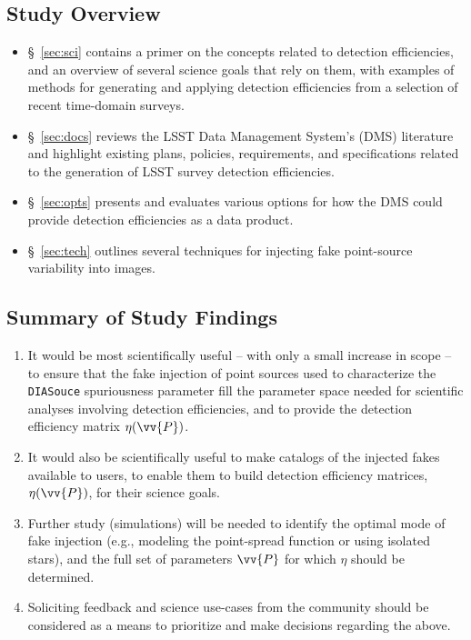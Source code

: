 \documentclass[DM,lsstdraft,toc]{lsstdoc}
\begin{document}
\subsection{Study Overview}
\begin{itemize}
\item \S~\ref{sec:sci} contains a primer on the concepts related to detection efficiencies, and an overview of several science goals that rely on them, with examples of methods for generating and applying detection efficiencies from a selection of recent time-domain surveys. 
\item \S~\ref{sec:docs} reviews the LSST Data Management System's (DMS) literature and highlight existing plans, policies, requirements, and specifications related to the generation of LSST survey detection efficiencies. 
\item \S~\ref{sec:opts} presents and evaluates various options for how the DMS could provide detection efficiencies as a data product. 
\item \S~\ref{sec:tech} outlines several techniques for injecting fake point-source variability into images.
\end{itemize}

\subsection{Summary of Study Findings}
\begin{enumerate}
\item It would be most scientifically useful -- with only a small increase in scope -- to ensure that the fake injection of point sources used to characterize the {\tt DIASouce} spuriousness parameter fill the parameter space needed for scientific analyses involving detection efficiencies, and to provide the detection efficiency matrix $\eta(\vv{P})$.
\item It would also be scientifically useful to make catalogs of the injected fakes available to users, to enable them to build detection efficiency matrices, $\eta(\vv{P})$, for their science goals.
\item Further study (simulations) will be needed to identify the optimal mode of fake injection (e.g., modeling the point-spread function or using isolated stars), and the full set of parameters $\vv{P}$ for which $\eta$ should be determined.
\item Soliciting feedback and science use-cases from the community should be considered as a means to prioritize and make decisions regarding the above.
\end{enumerate}
\end{document}

